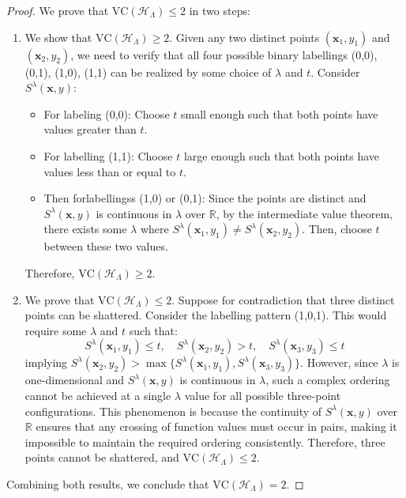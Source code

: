 \documentclass{article}
\newcommand{\1}{\mathbbm{1}}
\theoremstyle{plain}
\theoremstyle{definition}
\theoremstyle{remark}
\begin{document}
\begin{proof}
We prove that $\text{VC}(\mathcal{H}_{\Lambda}) \leq 2$ in two steps:

\begin{enumerate}
    \item We show that $\text{VC}(\mathcal{H}_{\Lambda}) \ge 2$. Given any two distinct points $(\boldsymbol{x}_1,y_1)$ and $(\boldsymbol{x}_2,y_2)$, we need to verify that all four possible binary labellings (0,0), (0,1), (1,0), (1,1) can be realized by some choice of $\lambda$ and $t$. Consider $S^\lambda(\boldsymbol{x},y)$:

    \begin{itemize}
        \item For labeling (0,0): Choose $t$ small enough such that both points have values greater than $t$.
        \item For labelling (1,1): Choose $t$ large enough such that both points have values less than or equal to $t$.
        \item Then forlabellingss (1,0) or (0,1): Since the points are distinct and $S^\lambda(\boldsymbol{x},y)$ is continuous in $\lambda$ over $\mathbb{R}$, by the intermediate value theorem, there exists some $\lambda$ where $S^\lambda(\boldsymbol{x}_1,y_1) \neq S^\lambda(\boldsymbol{x}_2,y_2)$. Then, choose $t$ between these two values. 
    \end{itemize}
    Therefore, $\text{VC}(\mathcal{H}_{\Lambda}) \ge 2$.
    \item We prove that $\text{VC}(\mathcal{H}_{\Lambda}) \le 2$. Suppose for contradiction that three distinct points can be shattered. Consider the labelling pattern (1,0,1). This would require some $\lambda$ and $t$ such that:
    \[
    S^\lambda(\boldsymbol{x}_1,y_1)\le t,\quad S^\lambda(\boldsymbol{x}_2,y_2)> t,\quad S^\lambda(\boldsymbol{x}_3,y_3)\le t
    \]
    implying $S^\lambda(\boldsymbol{x}_2,y_2)>\max\{S^\lambda(\boldsymbol{x}_1,y_1), S^\lambda(\boldsymbol{x}_3,y_3)\}$. However, since $\lambda$ is one-dimensional and $S^\lambda(\boldsymbol{x},y)$ is continuous in $\lambda$, such a complex ordering cannot be achieved at a single $\lambda$ value for all possible three-point configurations. 
    This phenomenon is because the continuity of $S^\lambda(\boldsymbol{x},y)$ over $\mathbb{R}$ ensures that any crossing of function values must occur in pairs, making it impossible to maintain the required ordering consistently. Therefore, three points cannot be shattered, and $\text{VC}(\mathcal{H}_{\Lambda}) \le 2$.
\end{enumerate}

Combining both results, we conclude that $\text{VC}(\mathcal{H}_{\Lambda}) = 2$.
\end{proof}
\end{document}
